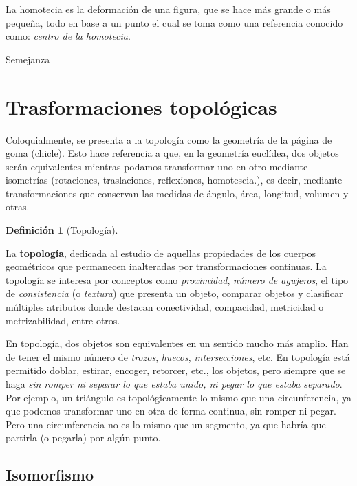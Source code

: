 \documentclass[16pt,]{krantz}
\theoremstyle{definition}
\newtheorem{definition}{Definición}[chapter]
\theoremstyle{definition}
\theoremstyle{definition}
\theoremstyle{definition}
\theoremstyle{remark}
\begin{document}
La homotecia es la deformación de una figura, que se hace más grande o más pequeña, todo en base a un punto el cual se toma como una referencia conocido como: \emph{centro de la homotecia}.

Semejanza

\hypertarget{trasformaciones-topoluxf3gicas}{%
\section{Trasformaciones topológicas}\label{trasformaciones-topoluxf3gicas}}

Coloquialmente, se presenta a la topología como la geometría de la página de goma (chicle). Esto hace referencia a que, en la geometría euclídea, dos objetos serán equivalentes mientras podamos transformar uno en otro mediante isometrías (rotaciones, traslaciones, reflexiones, homotescia.), es decir, mediante transformaciones que conservan las medidas de ángulo, área, longitud, volumen y otras.

\begin{definition}[Topología]
\protect\hypertarget{def:topologia}{}{\label{def:topologia} {} }
\end{definition}

La \textbf{topología}, dedicada al estudio de aquellas propiedades de los cuerpos geométricos que permanecen inalteradas por transformaciones continuas. La topología se interesa por conceptos como \emph{proximidad}, \emph{número de agujeros}, el tipo de \emph{consistencia} (o \emph{textura}) que presenta un objeto, comparar objetos y clasificar múltiples atributos donde destacan conectividad, compacidad, metricidad o metrizabilidad, entre otros.

En topología, dos objetos son equivalentes en un sentido mucho más amplio. Han de tener el mismo número de \emph{trozos}, \emph{huecos}, \emph{intersecciones}, etc. En topología está permitido doblar, estirar, encoger, retorcer, etc., los objetos, pero siempre que se haga \emph{sin romper ni separar lo que estaba unido, ni pegar lo que estaba separado}. Por ejemplo, un triángulo es topológicamente lo mismo que una circunferencia, ya que podemos transformar uno en otra de forma continua, sin romper ni pegar. Pero una circunferencia no es lo mismo que un segmento, ya que habría que partirla (o pegarla) por algún punto.

\hypertarget{isomorfismo}{%
\subsection{Isomorfismo}\label{isomorfismo}}
\end{document}
